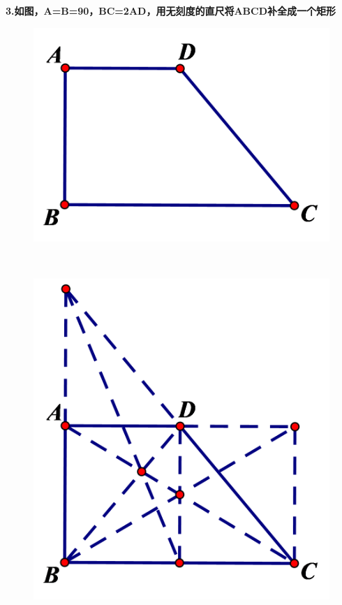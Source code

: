 \documentclass{article}
\begin{document}
    \newpage
    \noindent \textbf{3.如图，\bm{$\angle $}A=\bm{$\angle $}B=90\bm{$^{\circ }$}，BC=2AD，用无刻度的直尺将ABCD补全成一个矩形} \\
    \begin{figure}[ht]
        \centering
        \includegraphics[scale=0.2]{3.png}
    \end{figure}\\
    \begin{figure}[ht]
        \centering
        \includegraphics[scale=0.2]{3jie.png}
    \end{figure}\\
\end{document}
